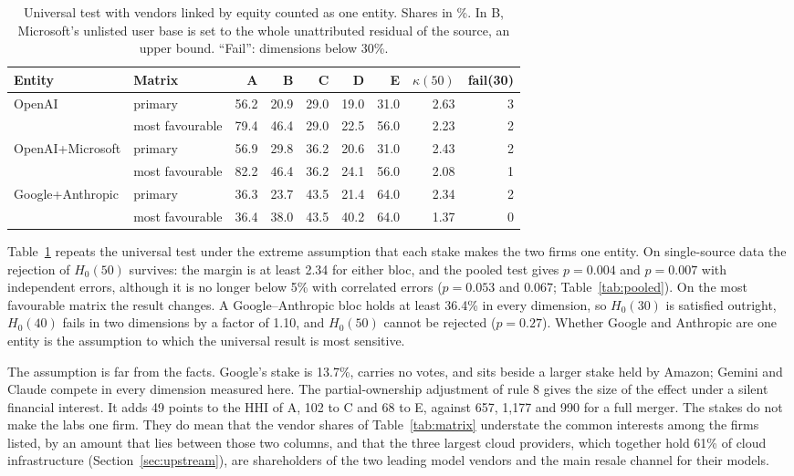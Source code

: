 \documentclass[11pt]{article}
\newcommand{\Hzero}{H_{0}}
\begin{document}
\begin{table}[t]
\centering\small
\caption{Universal test with vendors linked by equity counted as one entity. Shares in \%. In B, Microsoft's unlisted user base is set to the whole unattributed residual of the source, an upper bound. ``Fail'': dimensions below 30\%.}
\label{tab:blocs}
\begin{tabular}{@{}llrrrrrrr@{}}
\toprule
Entity & Matrix & A & B & C & D & E & $\kappa(50)$ & fail(30) \\
\midrule
OpenAI & primary & 56.2 & 20.9 & 29.0 & 19.0 & 31.0 & 2.63 & 3 \\
 & most favourable & 79.4 & 46.4 & 29.0 & 22.5 & 56.0 & 2.23 & 2 \\
OpenAI+Microsoft & primary & 56.9 & 29.8 & 36.2 & 20.6 & 31.0 & 2.43 & 2 \\
 & most favourable & 82.2 & 46.4 & 36.2 & 24.1 & 56.0 & 2.08 & 1 \\
Google+Anthropic & primary & 36.3 & 23.7 & 43.5 & 21.4 & 64.0 & 2.34 & 2 \\
 & most favourable & 36.4 & 38.0 & 43.5 & 40.2 & 64.0 & 1.37 & 0 \\
\bottomrule
\end{tabular}
\end{table}

Table~\ref{tab:blocs} repeats the universal test under the extreme assumption that each stake makes the two firms one entity. On single-source data the rejection of $\Hzero(50)$ survives: the margin is at least 2.34 for either bloc, and the pooled test gives $p=0.004$ and $p=0.007$ with independent errors, although it is no longer below 5\% with correlated errors ($p=0.053$ and $0.067$; Table~\ref{tab:pooled}). On the most favourable matrix the result changes. A Google--Anthropic bloc holds at least 36.4\% in every dimension, so $\Hzero(30)$ is satisfied outright, $\Hzero(40)$ fails in two dimensions by a factor of 1.10, and $\Hzero(50)$ cannot be rejected ($p=0.27$). Whether Google and Anthropic are one entity is the assumption to which the universal result is most sensitive.

The assumption is far from the facts. Google's stake is 13.7\%, carries no votes, and sits beside a larger stake held by Amazon; Gemini and Claude compete in every dimension measured here. The partial-ownership adjustment of rule 8 gives the size of the effect under a silent financial interest. It adds 49 points to the HHI of A, 102 to C and 68 to E, against 657, 1{,}177 and 990 for a full merger. The stakes do not make the labs one firm. They do mean that the vendor shares of Table~\ref{tab:matrix} understate the common interests among the firms listed, by an amount that lies between those two columns, and that the three largest cloud providers, which together hold 61\% of cloud infrastructure (Section~\ref{sec:upstream}), are shareholders of the two leading model vendors and the main resale channel for their models.
\end{document}
